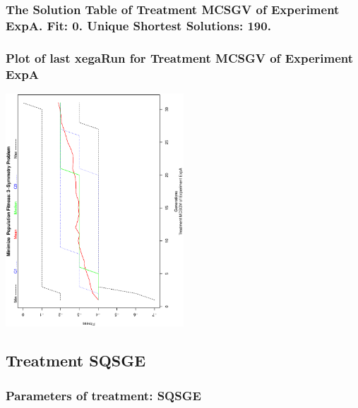 \documentclass[18pt,c]{beamer}
\makeatletter
\def\beamer@writeslidentry@miniframesoff{%
  \expandafter\beamer@ifempty\expandafter{\beamer@framestartpage}{}%
  {%
   \clearpage\beamer@notesactions%
  }
}
\newcommand*{\miniframesoff}{\let\beamer@writeslidentry=\beamer@writeslidentry@miniframesoff}
\makeatother
\begin{document}
 \begin{frame}
 \fontsize{8pt}{9pt}\selectfont
 \frametitle{ The Solution Table of Treatment MCSGV of Experiment ExpA. Fit: 0. Unique Shortest Solutions: 190. }

 \label{ExpASolutionTable002.tex}  
 \end{frame}

 \begin{frame}
 \frametitle{ Plot of last xegaRun for Treatment MCSGV of Experiment ExpA }
 \begin{center}
\includegraphics[width=0.5\textwidth, angle=-90]
{ExpAPlotPopStatsFigure002.eps}
 \end{center}
 \label{report/ExpAPlotPopStatsFigure002.eps}  
 \end{frame}

\miniframesoff
\subsection{Treatment SQSGE}

 \begin{frame}
 \fontsize{8pt}{9pt}\selectfont
 \frametitle{  Parameters of treatment: SQSGE 
 }

 \label{ExpAtParmTable012.tex}  
 \end{frame}
\end{document}
